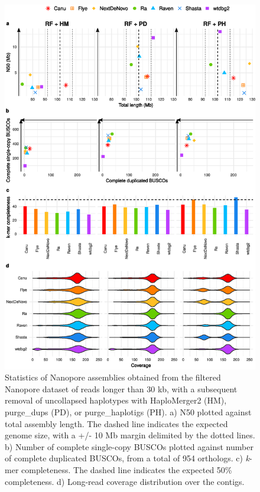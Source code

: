 \begin{suppsection}
    \begin{figure}[ht]
    \centering
     \includegraphics[width=13.5cm]{fig/benchmark/supp_nanopore_filtering_purging_v20201012.eps}
   \caption{Statistics of Nanopore assemblies obtained from the filtered Nanopore dataset of reads longer than 30 kb, with a subsequent removal of uncollapsed haplotypes with HaploMerger2 (HM), purge\_dups (PD), or purge\_haplotigs (PH). a) N50 plotted against total assembly length. The dashed line indicates the expected genome size, with a +/- 10 Mb margin delimited by the dotted lines. b) Number of complete single-copy BUSCOs plotted against number of complete duplicated BUSCOs, from a total of 954 orthologs. c) \textit{k}-mer completeness. The dashed line indicates the expected 50\% completeness. d) Long-read coverage distribution over the contigs.}
   \label{fig:nanopore_filtering_purging}
 \end{figure}
 

\end{suppsection}
